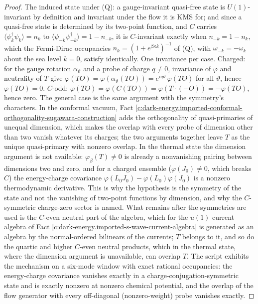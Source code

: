 \documentclass[11pt]{article}
\theoremstyle{definition}
\theoremstyle{plain}
\begin{document}
\begin{proof}
The induced state under (Q): a gauge-invariant quasi-free state is $U(1)$-invariant by definition and invariant under the flow it is KMS for; and since a quasi-free state is determined by its two-point function, and $C$ carries $\langle\psi^\dagger_k\psi_k\rangle = n_k$ to $\langle\psi_{-k}\psi^\dagger_{-k}\rangle = 1 - n_{-k}$, it is $C$-invariant exactly when $n_{-k} = 1 - n_k$, which the Fermi-Dirac occupancies $n_k = (1 + e^{\beta\kappa k})^{-1}$ of (Q), with $\omega_{-k} = -\omega_k$ about the sea level $k = 0$, satisfy identically. One invariance per case. Charged: for the gauge rotation $\alpha_\vartheta$ and a probe of charge $q \neq 0$, invariance of $\varphi$ and neutrality of $T$ give $\varphi(T O) = \varphi(\alpha_\vartheta(T O)) = e^{iq\vartheta}\,\varphi(T O)$ for all $\vartheta$, hence $\varphi(TO) = 0$. $C$-odd: $\varphi(T O) = \varphi(C(T O)) = \varphi(T\cdot(-O)) = -\varphi(TO)$, hence zero. The general case is the same argument with the symmetry's characters. In the conformal vacuum, Fact \ref{c:dark-energy.imported-conformal-orthogonality-sugawara-construction} adds the orthogonality of quasi-primaries of unequal dimension, which makes the overlap with every probe of dimension other than two vanish whatever its charges; the two arguments together leave $T$ as the unique quasi-primary with nonzero overlap. In the thermal state the dimension argument is not available: $\varphi_\beta(T) \neq 0$ is already a nonvanishing pairing between dimensions two and zero, and for a charged ensemble ($\varphi(J_0) \neq 0$, which breaks $C$) the energy-charge covariance $\varphi(L_0 J_0) - \varphi(L_0)\varphi(J_0)$ is a nonzero thermodynamic derivative. This is why the hypothesis is the symmetry of the state and not the vanishing of two-point functions by dimension, and why the $C$-symmetric charge-zero sector is named. What remains after the symmetries are used is the $C$-even neutral part of the algebra, which for the $u(1)$ current algebra of Fact \ref{c:dark-energy.imported-s-wave-current-algebra} is generated as an algebra by the normal-ordered bilinears of the currents; $T$ belongs to it, and so do the quartic and higher $C$-even neutral products, which in the thermal state, where the dimension argument is unavailable, can overlap $T$. The script exhibits the mechanism on a six-mode window with exact rational occupancies: the energy-charge covariance vanishes exactly in a charge-conjugation-symmetric state and is exactly nonzero at nonzero chemical potential, and the overlap of the flow generator with every off-diagonal (nonzero-weight) probe vanishes exactly.

\end{proof}
\end{document}
